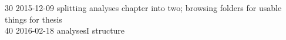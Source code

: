 \begin{footnotesize}
30	2015-12-09	splitting analyses chapter into two; browsing folders for usable things for thesis\\
40	2016-02-18	analysesI structure\\

\end{footnotesize}
